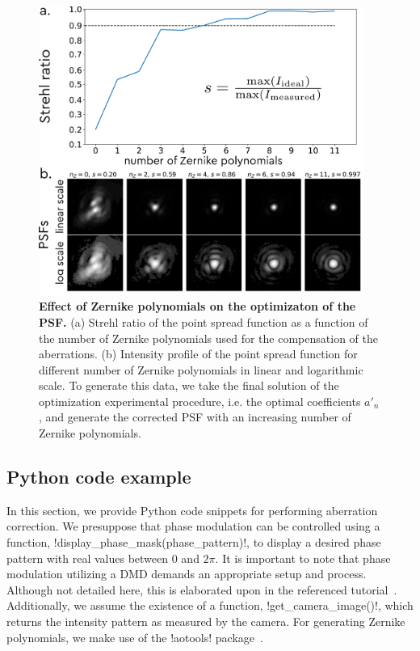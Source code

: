 \documentclass[12pt]{iopart}
\begin{document}
\begin{figure}
  \centering
  \includegraphics[width = 0.95\textwidth]{images/Zernike_2.pdf}
  \caption{
    \textbf{Effect of Zernike polynomials on the optimizaton of the PSF.}
    (a) Strehl ratio of the point spread function as a function of the number of Zernike polynomials used
    for the compensation of the aberrations.
    (b) Intensity profile of the point spread function for different number of Zernike polynomials
    in linear and logarithmic scale.
    To generate this data, we take the final solution of the optimization experimental procedure,
    i.e. the optimal coefficients $a'_n$,
    and generate the corrected PSF with an increasing number of Zernike polynomials.
  }
  \label{fig:zernike}
\end{figure}


\subsection{Python code example}


In this section, we provide Python code snippets for performing aberration correction.
We presuppose that phase modulation can be controlled using a function,
!display_phase_mask(phase_pattern)!, to display a desired phase pattern
with real values between $0$ and $2\pi$.
It is important to note that phase modulation utilizing a DMD demands an appropriate setup
and process. Although not detailed here,
this is elaborated upon in the referenced tutorial~\cite{Gutierrez2024DMD}.
Additionally, we assume the existence of a function, !get_camera_image()!,
which returns the intensity pattern as measured by the camera.
For generating Zernike polynomials, we make use of the !aotools! package~\cite{Townson2019aotools}.
\end{document}
